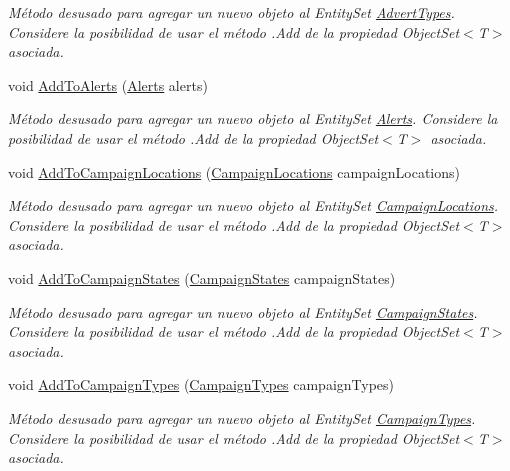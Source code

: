 \begin{DoxyCompactItemize}
\begin{DoxyCompactList}\small\item\em Método desusado para agregar un nuevo objeto al Entity\-Set \hyperlink{class_game_memory_1_1_advert_types}{Advert\-Types}. Considere la posibilidad de usar el método .Add de la propiedad Object\-Set$<$T$>$ asociada. \end{DoxyCompactList}\item 
void \hyperlink{class_game_memory_1_1_o_m_k_t_d_b_entities_aedcaf52099af392ca22539bde2cc076e}{Add\-To\-Alerts} (\hyperlink{class_game_memory_1_1_alerts}{Alerts} alerts)
\begin{DoxyCompactList}\small\item\em Método desusado para agregar un nuevo objeto al Entity\-Set \hyperlink{class_game_memory_1_1_alerts}{Alerts}. Considere la posibilidad de usar el método .Add de la propiedad Object\-Set$<$T$>$ asociada. \end{DoxyCompactList}\item 
void \hyperlink{class_game_memory_1_1_o_m_k_t_d_b_entities_af4cf8e74e5269f08f58daab1201c3249}{Add\-To\-Campaign\-Locations} (\hyperlink{class_game_memory_1_1_campaign_locations}{Campaign\-Locations} campaign\-Locations)
\begin{DoxyCompactList}\small\item\em Método desusado para agregar un nuevo objeto al Entity\-Set \hyperlink{class_game_memory_1_1_campaign_locations}{Campaign\-Locations}. Considere la posibilidad de usar el método .Add de la propiedad Object\-Set$<$T$>$ asociada. \end{DoxyCompactList}\item 
void \hyperlink{class_game_memory_1_1_o_m_k_t_d_b_entities_af2a779d319fae157b8b2be8929457eb8}{Add\-To\-Campaign\-States} (\hyperlink{class_game_memory_1_1_campaign_states}{Campaign\-States} campaign\-States)
\begin{DoxyCompactList}\small\item\em Método desusado para agregar un nuevo objeto al Entity\-Set \hyperlink{class_game_memory_1_1_campaign_states}{Campaign\-States}. Considere la posibilidad de usar el método .Add de la propiedad Object\-Set$<$T$>$ asociada. \end{DoxyCompactList}\item 
void \hyperlink{class_game_memory_1_1_o_m_k_t_d_b_entities_ab0fab6d7cf71c0ecc1ebedbc678211fb}{Add\-To\-Campaign\-Types} (\hyperlink{class_game_memory_1_1_campaign_types}{Campaign\-Types} campaign\-Types)
\begin{DoxyCompactList}\small\item\em Método desusado para agregar un nuevo objeto al Entity\-Set \hyperlink{class_game_memory_1_1_campaign_types}{Campaign\-Types}. Considere la posibilidad de usar el método .Add de la propiedad Object\-Set$<$T$>$ asociada. \end{DoxyCompactList}\item 

\end{DoxyCompactItemize}
